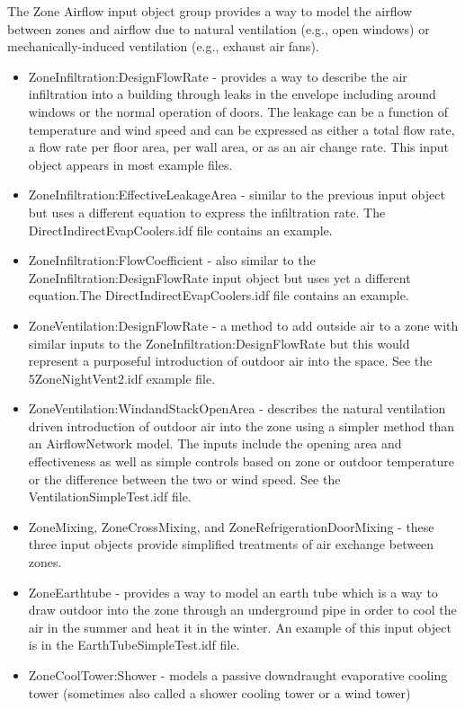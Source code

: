 The Zone Airflow input object group provides a way to model the airflow
between zones and airflow due to natural ventilation (e.g., open windows)
or mechanically-induced ventilation (e.g., exhaust air fans).
\begin{itemize}
\item ZoneInfiltration:DesignFlowRate - provides a way to describe the air
infiltration into a building through leaks in the envelope including
around windows or the normal operation of doors. The leakage can be
a function of temperature and wind speed and can be expressed as either
a total flow rate, a flow rate per floor area, per wall area, or as
an air change rate. This input object appears in most example files.
\item ZoneInfiltration:EffectiveLeakageArea - similar to the previous input
object but uses a different equation to express the infiltration rate.
The DirectIndirectEvapCoolers.idf file contains an example.
\item ZoneInfiltration:FlowCoefficient - also similar to the ZoneInfiltration:DesignFlowRate
input object but uses yet a different equation.The DirectIndirectEvapCoolers.idf
file contains an example.
\item ZoneVentilation:DesignFlowRate - a method to add outside air to a
zone with similar inputs to the ZoneInfiltration:DesignFlowRate but
this would represent a purposeful introduction of outdoor air into
the space. See the 5ZoneNightVent2.idf example file.
\item ZoneVentilation:WindandStackOpenArea - describes the natural ventilation
driven introduction of outdoor air into the zone using a simpler method
than an AirflowNetwork model. The inputs include the opening area
and effectiveness as well as simple controls based on zone or outdoor
temperature or the difference between the two or wind speed. See the
VentilationSimpleTest.idf file.
\item ZoneMixing, ZoneCrossMixing, and ZoneRefrigerationDoorMixing - these
three input objects provide simplified treatments of air exchange
between zones.
\item ZoneEarthtube - provides a way to model an earth tube which is a way
to draw outdoor into the zone through an underground pipe in order
to cool the air in the summer and heat it in the winter. An example
of this input object is in the EarthTubeSimpleTest.idf file.
\item ZoneCoolTower:Shower - models a passive downdraught evaporative cooling
tower (sometimes also called a shower cooling tower or a wind tower)

\end{itemize}
